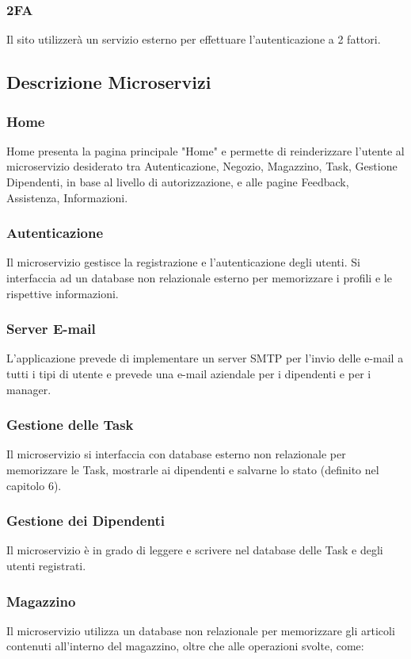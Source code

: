 \documentclass{report}
\begin{document}
\subsubsection{2FA}
Il sito utilizzerà un servizio esterno per effettuare l'autenticazione a 2 fattori.

\subsection{Descrizione Microservizi}

\subsubsection*{Home}
Home presenta la pagina principale "Home" e permette di reinderizzare l'utente al microservizio desiderato tra Autenticazione, Negozio, Magazzino, Task, Gestione Dipendenti, in base al livello di autorizzazione, e alle pagine Feedback, Assistenza, Informazioni.

\subsubsection*{Autenticazione}
Il microservizio gestisce la registrazione e l'autenticazione degli utenti. Si interfaccia ad un database non relazionale esterno per memorizzare i profili e le rispettive informazioni.

\subsubsection*{Server E-mail}
L'applicazione prevede di implementare un server SMTP per l’invio delle e-mail a tutti i tipi di utente e prevede una e-mail aziendale per i dipendenti e per i manager.

\subsubsection*{Gestione delle Task}
Il microservizio si interfaccia con database esterno non relazionale per memorizzare le Task, mostrarle ai dipendenti e salvarne lo stato (definito nel capitolo 6).

\subsubsection*{Gestione dei Dipendenti}
Il microservizio è in grado di leggere e scrivere nel database delle Task e degli utenti registrati.

\subsubsection*{Magazzino}
Il microservizio utilizza un database non relazionale per memorizzare gli articoli contenuti all’interno del magazzino, oltre che alle operazioni svolte, come:
\end{document}
